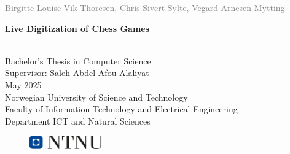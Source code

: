 \begin{titlepage}
\vspace*{1.5cm}

\noindent  \textcolor{gray}{\large Birgitte Louise Vik Thoresen, Chris Sivert Sylte, Vegard Arnesen Mytting} \\
\vspace{1cm}

\noindent \textbf{\Large Live Digitization of Chess Games} \\
\vspace{0.5cm}

 \\

\vspace{7cm}
\noindent Bachelor's Thesis in Computer Science \\
Supervisor: Saleh Abdel-Afou Alaliyat \\
May 2025 \\

\vspace{0.2cm}
\noindent Norwegian University of Science and Technology \\
Faculty of Information Technology and Electrical Engineering \\
Department ICT and Natural Sciences \\

\begin{figure}[h]
    \includegraphics[width=0.28\textwidth]{figures/ntnu_basic.png}
\end{figure}
\end{titlepage}
\restoregeometry
\myemptypage %